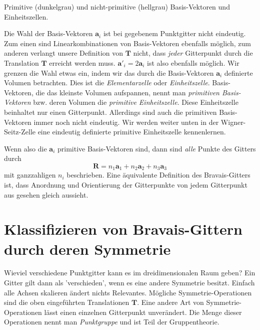 \begin{marginfigure}

\caption{Primitive (dunkelgrau) und nicht-primitive (hellgrau) Basis-Vektoren und Einheitszellen.}
\end{marginfigure}


Die Wahl der Basis-Vektoren   $\mathbf{a}_i$ ist  bei gegebenem Punktgitter nicht eindeutig. Zum einen sind Linearkombinationen von  Basis-Vektoren ebenfalls möglich, zum anderen verlangt unsere Definition von $\mathbf{T}$ nicht, dass \emph{jeder} Gitterpunkt durch die Translation $\mathbf{T}$  erreicht werden muss.  $\mathbf{a}'_i = 2 \mathbf{a}_i$ ist also ebenfalls möglich. Wir grenzen die Wahl etwas ein, indem wir das durch die Basis-Vektoren   $\mathbf{a}_i$  definierte Volumen betrachten. Dies ist die \emph{Elementarzelle} oder \emph{Einheitszelle}. Basis-Vektoren, die das kleinste Volumen aufspannen, nennt man \emph{primitiven Basis-Vektoren} bzw. deren Volumen die \emph{primitive Einheitszelle}. Diese Einheitszelle beinhaltet nur einen Gitterpunkt. Allerdings sind auch die primitiven Basis-Vektoren immer noch nicht eindeutig. Wir werden weiter unten in der Wigner-Seitz-Zelle eine eindeutig definierte primitive Einheitszelle kennenlernen.

Wenn also die $\mathbf{a}_i$ primitive  Basis-Vektoren sind, dann sind \emph{alle} Punkte des Gitters durch 
\begin{equation}
 \mathbf{R} = n_1 \mathbf{a}_1 + n_2 \mathbf{a}_2 + n_3 \mathbf{a}_3  
\end{equation}
mit ganzzahligen  $n_i$ beschrieben. Eine äquivalente Definition des Bravais-Gitters ist, dass Anordnung und Orientierung der Gitterpunkte von jedem Gitterpunkt aus gesehen gleich aussieht.


\section{Klassifizieren von Bravais-Gittern durch deren Symmetrie}

Wieviel verschiedene Punktgitter kann es im dreidimensionalen Raum geben? Ein Gitter gilt dann als 'verschieden', wenn es eine andere Symmetrie besitzt. Einfach alle Achsen skalieren ändert nichts Relevantes. Mögliche Symmetrie-Operationen sind die oben eingeführten Translationen $\mathbf{T}$. Eine andere Art von Symmetrie-Operationen lässt einen einzelnen Gitterpunkt unverändert. Die Menge dieser Operationen nennt man \emph{Punktgruppe} und ist Teil der Gruppentheorie.

